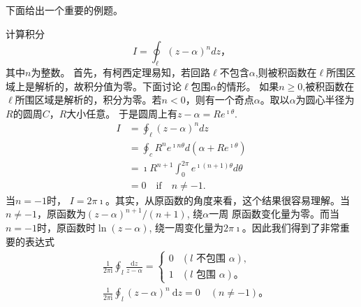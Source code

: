 下面给出一个重要的例题。
\begin{examplebox}{计算积分\[ I = \oint_\ell (z-\alpha)^n dz， \]其中$n$为整数。}
首先，有柯西定理易知，若回路$\ell$不包含$\alpha$,则被积函数在$\ell$所围区域上是解析的，故积分值为零。下面讨论$\ell$包围$\alpha$的情形。
如果$n\geq 0$,被积函数在$\ell$所围区域是解析的，积分为零。若$n<0$，则有一个奇点$\alpha$。取以$\alpha$为圆心半径为$R$的圆周$C$，$R$大小任意。
于是圆周上有$z-\alpha = Re^{\imath \theta}$.
\begin{equation}
\begin{aligned}
    I &= \oint_\ell (z-\alpha)^n dz\\
     &= \oint_c R^n e^{\imath n \theta} d (\alpha + R e^{\imath \theta})\\
     & =  \imath R^{n+1} \int_0^{2\pi} e^{\imath (n+1)\theta}  d\theta \\
     & = 0 \quad \textrm{if} \quad n\neq -1.
\end{aligned}
\end{equation}
当$n = -1$时， $I = 2\pi \imath$。其实，从原函数的角度来看，这个结果很容易理解。当$n\neq -1$，原函数为$(z-\alpha)^{n+1}/(n+1)$, 绕$\alpha$一周
原函数变化量为零。而当$n=-1$时，原函数时$\ln(z-\alpha)$, 绕一周变化量为$2\pi \imath$。因此我们得到了非常重要的表达式
\begin{equation}
    \begin{aligned}
        & \frac{1}{2 \pi \mathrm{i}} \oint_l \frac{\mathrm{d} z}{z-\alpha}= \begin{cases}0 & (l \text { 不包围 } \alpha), \\
        1 & (l \text { 包围 } \alpha) \textrm{。} \end{cases} \\
        & \frac{1}{2 \pi \mathrm{i}} \oint_l(z-\alpha)^n \mathrm{~d} z=0 \quad(n \neq-1) \textrm{。}
        \end{aligned}
\end{equation}
\end{examplebox}